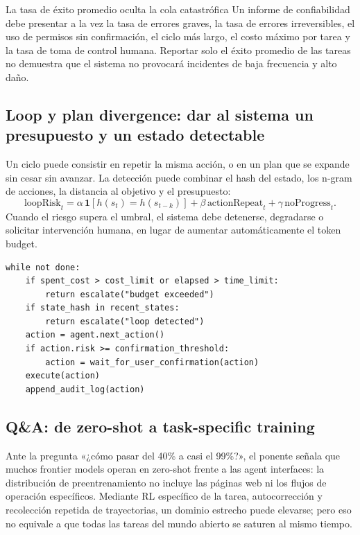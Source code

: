 \begin{warningbox}{La tasa de éxito promedio oculta la cola catastrófica}
Un informe de confiabilidad debe presentar a la vez la tasa de errores graves, la tasa de errores irreversibles, el uso de permisos sin confirmación, el ciclo más largo, el costo máximo por tarea y la tasa de toma de control humana. Reportar solo el éxito promedio de las tareas no demuestra que el sistema no provocará incidentes de baja frecuencia y alto daño.
\end{warningbox}

\subsection{Loop y plan divergence: dar al sistema un presupuesto y un estado detectable}

Un ciclo puede consistir en repetir la misma acción, o en un plan que se expande sin cesar sin avanzar. La detección puede combinar el hash del estado, los n-gram de acciones, la distancia al objetivo y el presupuesto:
\[
\text{loopRisk}_t=
\alpha\,\mathbf{1}[h(s_t)=h(s_{t-k})]
+\beta\,\text{actionRepeat}_t
+\gamma\,\text{noProgress}_t.
\]
Cuando el riesgo supera el umbral, el sistema debe detenerse, degradarse o solicitar intervención humana, en lugar de aumentar automáticamente el token budget.

\begin{lstlisting}[caption={Ciclo de ejecución con presupuesto, detección de repeticiones y toma de control humana}]
while not done:
    if spent_cost > cost_limit or elapsed > time_limit:
        return escalate("budget exceeded")
    if state_hash in recent_states:
        return escalate("loop detected")
    action = agent.next_action()
    if action.risk >= confirmation_threshold:
        action = wait_for_user_confirmation(action)
    execute(action)
    append_audit_log(action)
\end{lstlisting}

\subsection{Q\&A: de zero-shot a task-specific training}

Ante la pregunta «¿cómo pasar del 40\% a casi el 99\%?», el ponente señala que muchos frontier models operan en zero-shot frente a las agent interfaces: la distribución de preentrenamiento no incluye las páginas web ni los flujos de operación específicos. Mediante RL específico de la tarea, autocorrección y recolección repetida de trayectorias, un dominio estrecho puede elevarse; pero eso no equivale a que todas las tareas del mundo abierto se saturen al mismo tiempo.

